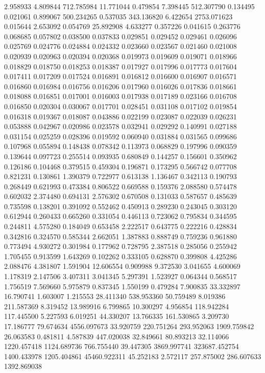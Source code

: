 2.958933
4.809844
712.785984
11.771044
0.479854
7.398445
512.307790
0.134495
0.021061
0.899067
500.234265
0.537035
343.136820
6.422654
2753.071623
0.015644
2.653092
0.054769
25.892908
4.633277
0.357226
0.041615
0.263776
0.068685
0.057802
0.038500
0.037833
0.029851
0.029452
0.029461
0.026096
0.025769
0.024776
0.024884
0.024332
0.023660
0.023567
0.021460
0.021008
0.020939
0.020963
0.020394
0.020368
0.019973
0.019609
0.019071
0.018966
0.018829
0.018750
0.018253
0.018387
0.017927
0.017996
0.017773
0.017604
0.017411
0.017209
0.017524
0.016891
0.016812
0.016600
0.016907
0.016571
0.016860
0.016984
0.016756
0.016206
0.017960
0.016026
0.017836
0.018661
0.018088
0.016851
0.017001
0.016003
0.017938
0.017189
0.023166
0.016708
0.016850
0.020304
0.030067
0.017701
0.028451
0.031108
0.017102
0.019854
0.016318
0.019367
0.018087
0.043886
0.022199
0.023087
0.022039
0.026231
0.053888
0.042967
0.020986
0.023578
0.032941
0.029292
0.140991
0.027188
0.031154
0.025259
0.028396
0.019592
0.060940
0.031884
0.031565
0.099686
0.107968
0.055894
0.148438
0.078342
0.113973
0.068829
0.197996
0.090359
0.139644
0.097723
0.255514
0.093935
0.680849
0.144257
0.156601
0.350962
0.126186
0.104468
0.379515
0.459304
0.196871
0.173295
0.566742
0.077708
0.821231
0.130861
1.390379
0.722977
0.613138
1.136467
0.342113
0.190793
0.268449
0.621993
0.473384
0.806522
0.669588
0.159376
2.088580
0.574478
0.602032
2.374480
0.694131
2.576302
0.670508
0.131033
0.587657
0.485639
0.735598
0.138201
0.391092
0.552462
0.450913
0.289230
0.243045
0.303120
0.612944
0.260433
0.665260
0.331054
0.446113
0.723062
0.795834
0.344595
0.244811
4.575280
0.184049
0.653458
2.222517
0.643775
0.222216
0.428834
0.342816
0.324570
0.585344
2.662051
1.387883
0.888749
0.759236
0.961880
0.773494
4.930272
0.301984
0.177962
0.728795
2.387518
0.285056
0.255942
1.705455
0.913599
1.643269
0.102262
0.333105
0.628870
0.399808
4.425286
2.088476
4.381807
1.591904
12.606554
0.909988
9.372530
3.041655
4.600069
1.178319
2.147506
3.407311
3.041345
5.297391
1.523927
0.064344
0.568517
1.756519
7.569660
5.975879
0.837345
1.550199
0.479284
7.900835
33.332897
16.790741
1.603007
1.215553
28.411340
538.953360
50.759489
8.019386
211.587369
8.319452
13.989916
6.799865
10.300297
4.956854
118.942284
117.445500
5.227593
6.019251
44.330207
13.766335
161.530865
3.209730
17.186777
79.674634
4556.097673
33.920759
220.751264
293.952063
1909.759842
26.063583
0.481811
4.587839
447.020038
32.849661
80.893213
32.114066
1220.457418
1124.689736
766.755440
39.447305
3869.997741
323687.452754
1400.433978
1205.404861
45460.922311
45.252183
2.572117
257.875002
286.607633
1392.869038
